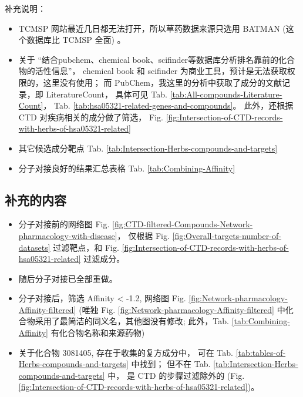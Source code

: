 \documentclass[
]{article}
\providecommand{\tightlist}{%
  \setlength{\itemsep}{0pt}\setlength{\parskip}{0pt}}
\begin{document}
补充说明：

\begin{itemize}
\tightlist
\item
  TCMSP 网站最近几日都无法打开，所以草药数据来源只选用 BATMAN (这个数据库比 TCMSP 全面) 。
\item
  关于 ``结合pubchem、chemical book、scifinder等数据库分析排名靠前的化合物的活性信息''，
  chemical book 和 scifinder 为商业工具，预计是无法获取权限的，这里没有使用；
  而 PubChem，我这里的分析中获取了成分的文献记录，即 LiteratureCount，
  具体可见 Tab. \ref{tab:All-compounds-Literature-Count}，
  Tab. \ref{tab:hsa05321-related-genes-and-compounds}。
  此外，还根据 CTD 对疾病相关的成分做了筛选，
  Fig. \ref{fig:Intersection-of-CTD-records-with-herbs-of-hsa05321-related}
\item
  其它候选成分靶点 Tab. \ref{tab:Intersection-Herbs-compounds-and-targets}
\item
  分子对接良好的结果汇总表格 Tab. \ref{tab:Combining-Affinity}
\end{itemize}

\hypertarget{ux8865ux5145ux7684ux5185ux5bb9}{%
\subsection{补充的内容}\label{ux8865ux5145ux7684ux5185ux5bb9}}

\begin{itemize}
\tightlist
\item
  分子对接前的网络图 Fig. \ref{fig:CTD-filtered-Compounds-Network-pharmacology-with-disease}，
  仅根据 Fig. \ref{fig:Overall-targets-number-of-datasets} 过滤靶点，和
  Fig. \ref{fig:Intersection-of-CTD-records-with-herbs-of-hsa05321-related} 过滤成分。
\item
  随后分子对接已全部重做。
\item
  分子对接后，筛选 Affinity \textless{} -1.2, 网络图 Fig. \ref{fig:Network-pharmacology-Affinity-filtered}
  (唯独 Fig. \ref{fig:Network-pharmacology-Affinity-filtered} 中化合物采用了最简洁的同义名，其他图没有修改;
  此外，Tab. \ref{tab:Combining-Affinity} 有化合物名称和来源药物)
\item
  关于化合物 3081405, 存在于收集的复方成分中，
  可在 Tab. \ref{tab:tables-of-Herbs-compounds-and-targets} 中找到；
  但不在 Tab. \ref{tab:Intersection-Herbs-compounds-and-targets} 中，
  是 CTD 的步骤过滤除外的 (Fig. \ref{fig:Intersection-of-CTD-records-with-herbs-of-hsa05321-related})。
\end{itemize}
\end{document}

